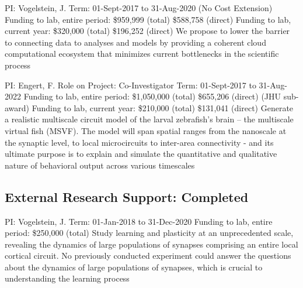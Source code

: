 \documentclass[10pt,colorlinks=true,urlcolor=blue]{moderncv}
\begin{document}
    {\newline PI: Vogelstein, J.
    \newline Term: 01-Sept-2017 to 31-Aug-2020 (No Cost Extension)
    \newline Funding to lab, entire period: \$959,999 (total) \$588,758 (direct)
    \newline Funding to lab, current year: \$320,000 (total) \$196,252 (direct)
    \newline We propose to lower the barrier to connecting data to analyses and models by providing a
    coherent cloud computational ecosystem that minimizes current bottlenecks in the scientific
    process}{}{}{}
    
    {\newline PI: Engert, F.
    \newline Role on Project: Co-Investigator
    \newline Term: 01-Sept-2017 to 31-Aug-2022
    \newline Funding to lab, entire period: \$1,050,000 (total) \$655,206 (direct) (JHU sub-award)
    \newline Funding to lab, current year: \$210,000 (total) \$131,041 (direct)
    \newline Generate a realistic multiscale circuit model of the larval zebrafish’s brain – the multiscale
    virtual fish (MSVF). The model will span spatial ranges from the nanoscale at the synaptic
    level, to local microcircuits to inter-area connectivity - and its ultimate purpose is to explain
    and simulate the quantitative and qualitative nature of behavioral output across various
    timescales}{}{}{}
    
    
    \subsection{External Research Support: Completed}
    
    {\newline PI: Vogelstein, J.
    \newline Term: 01-Jan-2018 to 31-Dec-2020
    \newline Funding to lab, entire period: \$250,000 (total)
    \newline Study learning and plasticity at an unprecedented scale, revealing the dynamics of large
    populations of synapses comprising an entire local cortical circuit. No previously conducted
    experiment could answer the questions about the dynamics of large populations of
    synapses, which is crucial to understanding the learning process}{}{}{}
    
\end{document}
